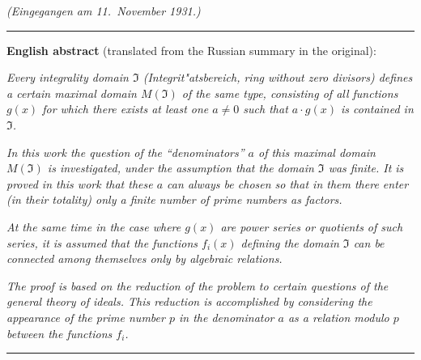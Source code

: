 \medskip
\hfill\textit{(Eingegangen am 11.\ November 1931.)}

\bigskip
\noindent\rule{\textwidth}{0.4pt}

\medskip
\noindent\textbf{English abstract} (translated from the Russian summary in the original):

\smallskip
\textit{Every integrality domain $\mathfrak{I}$ (Integrit"atsbereich, ring without zero divisors) defines a certain maximal domain $M(\mathfrak{I})$ of the same type, consisting of all functions $g(x)$ for which there exists at least one $a \neq 0$ such that $a \cdot g(x)$ is contained in $\mathfrak{I}$.}

\textit{In this work the question of the ``denominators'' $a$ of this maximal domain $M(\mathfrak{I})$ is investigated, under the assumption that the domain $\mathfrak{I}$ was finite. It is proved in this work that these $a$ can always be chosen so that in them there enter (in their totality) only a finite number of prime numbers as factors.}

\textit{At the same time in the case where $g(x)$ are power series or quotients of such series, it is assumed that the functions $f_i(x)$ defining the domain $\mathfrak{I}$ can be connected among themselves only by algebraic relations.}

\textit{The proof is based on the reduction of the problem to certain questions of the general theory of ideals. This reduction is accomplished by considering the appearance of the prime number $p$ in the denominator $a$ as a relation modulo $p$ between the functions $f_i$.}


\medskip
\noindent\rule{\textwidth}{0.4pt}

